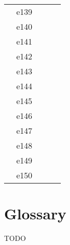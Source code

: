 \documentclass[10pt,letterpaper]{article}
\begin{document}
\begin{center}
\begin{tabular}{ |c|c|c|c|c|}
        & e139  &                &                &      \\
        & e140  &                &                &      \\
        & e141  &                &                &      \\
        & e142  &                &                &      \\
        & e143  &                &                &      \\
        & e144  &                &                &      \\
        & e145  &                &                &      \\
        & e146  &                &                &      \\
        & e147  &                &                &      \\
        & e148  &                &                &      \\
        & e149  &                &                &      \\
        & e150  &                &                &      \\

        \hline
        \end{tabular}
        \end{center}


\clearpage

\section{Glossary}
TODO
\clearpage
\end{document}
